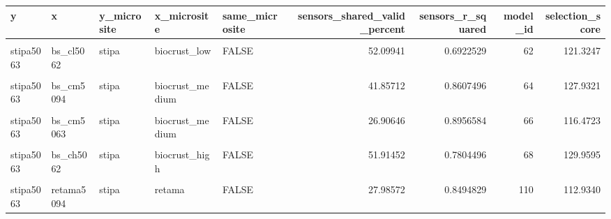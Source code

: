 \documentclass[]{article}
\begin{document}
\begin{table}[H]
\centering
\begin{tabular}[t]{l|l|l|l|l|r|r|r|r}
\hline
y & x & y\_microsite & x\_microsite & same\_microsite & sensors\_shared\_valid\_percent & sensors\_r\_squared & model\_id & selection\_score\\
\hline
\cellcolor{gray!6}{stipa5063} & \cellcolor{gray!6}{bs\_cl5094} & \cellcolor{gray!6}{stipa} & \cellcolor{gray!6}{biocrust\_low} & \cellcolor{gray!6}{FALSE} & \cellcolor{gray!6}{47.42330} & \cellcolor{gray!6}{0.7826120} & \cellcolor{gray!6}{61} & \cellcolor{gray!6}{125.6845}\\
\hline
stipa5063 & bs\_cl5062 & stipa & biocrust\_low & FALSE & 52.09941 & 0.6922529 & 62 & 121.3247\\
\hline
\cellcolor{gray!6}{stipa5063} & \cellcolor{gray!6}{bs\_cl5063} & \cellcolor{gray!6}{stipa} & \cellcolor{gray!6}{biocrust\_low} & \cellcolor{gray!6}{FALSE} & \cellcolor{gray!6}{66.13635} & \cellcolor{gray!6}{0.8021262} & \cellcolor{gray!6}{63} & \cellcolor{gray!6}{146.3490}\\
\hline
stipa5063 & bs\_cm5094 & stipa & biocrust\_medium & FALSE & 41.85712 & 0.8607496 & 64 & 127.9321\\
\hline
\cellcolor{gray!6}{stipa5063} & \cellcolor{gray!6}{bs\_cm5062} & \cellcolor{gray!6}{stipa} & \cellcolor{gray!6}{biocrust\_medium} & \cellcolor{gray!6}{FALSE} & \cellcolor{gray!6}{42.63754} & \cellcolor{gray!6}{0.7499577} & \cellcolor{gray!6}{65} & \cellcolor{gray!6}{117.6333}\\
\hline
stipa5063 & bs\_cm5063 & stipa & biocrust\_medium & FALSE & 26.90646 & 0.8956584 & 66 & 116.4723\\
\hline
\cellcolor{gray!6}{stipa5063} & \cellcolor{gray!6}{bs\_ch5094} & \cellcolor{gray!6}{stipa} & \cellcolor{gray!6}{biocrust\_high} & \cellcolor{gray!6}{FALSE} & \cellcolor{gray!6}{52.89274} & \cellcolor{gray!6}{0.7012173} & \cellcolor{gray!6}{67} & \cellcolor{gray!6}{123.0145}\\
\hline
stipa5063 & bs\_ch5062 & stipa & biocrust\_high & FALSE & 51.91452 & 0.7804496 & 68 & 129.9595\\
\hline
\cellcolor{gray!6}{stipa5063} & \cellcolor{gray!6}{bs\_ch5063} & \cellcolor{gray!6}{stipa} & \cellcolor{gray!6}{biocrust\_high} & \cellcolor{gray!6}{FALSE} & \cellcolor{gray!6}{59.66504} & \cellcolor{gray!6}{0.7433338} & \cellcolor{gray!6}{69} & \cellcolor{gray!6}{133.9984}\\
\hline
stipa5063 & retama5094 & stipa & retama & FALSE & 27.98572 & 0.8494829 & 110 & 112.9340\\

\end{tabular}
\end{table}
\end{document}
